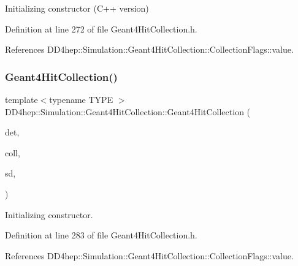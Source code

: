 Initializing constructor (C++ version) 



Definition at line 272 of file Geant4\+Hit\+Collection.\+h.



References D\+D4hep\+::\+Simulation\+::\+Geant4\+Hit\+Collection\+::\+Collection\+Flags\+::value.

\hypertarget{class_d_d4hep_1_1_simulation_1_1_geant4_hit_collection_a1dee728d2371ec8a5262395e484d6a8b}{}\label{class_d_d4hep_1_1_simulation_1_1_geant4_hit_collection_a1dee728d2371ec8a5262395e484d6a8b} 
\subsubsection{\texorpdfstring{Geant4\+Hit\+Collection()}{Geant4HitCollection()}\hspace{0.1cm}{\footnotesize\ttfamily [2/2]}}
{\footnotesize\ttfamily template$<$typename T\+Y\+PE $>$ \\
D\+D4hep\+::\+Simulation\+::\+Geant4\+Hit\+Collection\+::\+Geant4\+Hit\+Collection (\begin{DoxyParamCaption}\item[{const std\+::string \&}]{det,  }\item[{const std\+::string \&}]{coll,  }\item[{\hyperlink{class_d_d4hep_1_1_simulation_1_1_geant4_sensitive}{Geant4\+Sensitive} $\ast$}]{sd,  }\item[{const T\+Y\+PE $\ast$}]{ }\end{DoxyParamCaption})\hspace{0.3cm}{\ttfamily [inline]}}



Initializing constructor. 



Definition at line 283 of file Geant4\+Hit\+Collection.\+h.



References D\+D4hep\+::\+Simulation\+::\+Geant4\+Hit\+Collection\+::\+Collection\+Flags\+::value.

\hypertarget{class_d_d4hep_1_1_simulation_1_1_geant4_hit_collection_a2e586ee3c0a22239858669a4d310e386}{}\label{class_d_d4hep_1_1_simulation_1_1_geant4_hit_collection_a2e586ee3c0a22239858669a4d310e386} 
